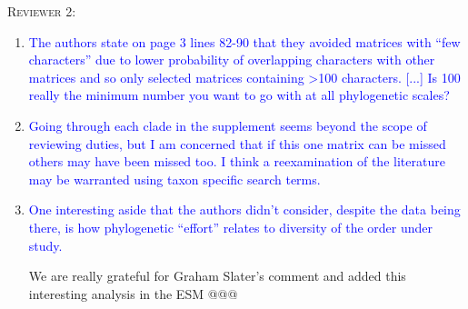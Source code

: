 \documentclass[12pt,letterpaper]{article}
\renewcommand{\section}[1]{%
\bigskip
\begin{center}
\begin{Large}
\normalfont\scshape #1
\medskip
\end{Large}
\end{center}}
\begin{document}

\section{Reviewer 2:}
\begin{enumerate}
\item{\textcolor{blue}{The authors state on page 3 lines 82-90 that they avoided matrices with ``few characters'' due to lower probability of overlapping characters with other matrices and so only selected matrices containing >100 characters. [...] Is 100 really the minimum number you want to go with at all phylogenetic scales?}}
\item{\textcolor{blue}{Going through each clade in the supplement seems beyond the scope of reviewing duties, but I am concerned that if this one matrix can be missed others may have been missed too. I think a reexamination of the literature may be warranted using taxon specific search terms.}}
\item{\textcolor{blue}{One interesting aside that the authors didn’t consider, despite the data being there, is how phylogenetic ``effort'' relates to diversity of the order under study.}}

We are really grateful for Graham Slater's %
comment and added this interesting analysis in the ESM @@@%
\end{enumerate}

\end{document}

